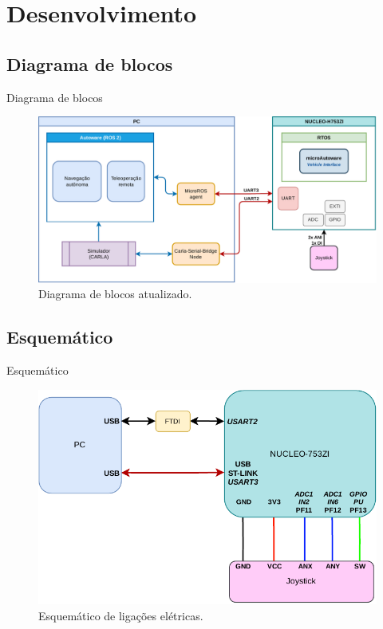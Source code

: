 \documentclass{if-beamer}
\begin{document}
\section{Desenvolvimento}

\subsection*{Diagrama de blocos}

\begin{frame}{Diagrama de blocos}
	
	\begin{figure}[H]
		\centering
		\includegraphics[width=0.9\linewidth]{block_diagram}
		\caption{Diagrama de blocos atualizado.}
		\label{fig:block_diagram}
	\end{figure}
	
\end{frame}

\subsection*{Esquemático}

\begin{frame}{Esquemático}
	
	
	\begin{figure}
		\centering
		\includegraphics[width=0.75\linewidth]{img/esquematico.pdf}
		\caption{Esquemático de ligações elétricas.}
		\label{fig:esquematico}
	\end{figure}
	
\end{frame}
\end{document}

